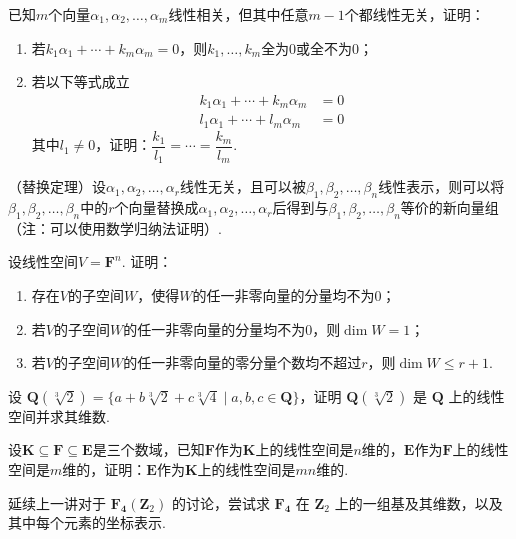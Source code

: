 \begin{exercise}
    \begin{exgroup}
        \item 已知$m$个向量$\alpha_1,\alpha_2,\ldots,\alpha_m$线性相关，但其中任意$m-1$个都线性无关，证明：
        \begin{enumerate}
            \item 若$k_1\alpha_1+\cdots+k_m\alpha_m=0$，则$k_1,\ldots,k_m$全为0或全不为0；

            \item 若以下等式成立
                  \begin{align*}
                      k_1\alpha_1+\cdots+k_m\alpha_m & =0 \\
                      l_1\alpha_1+\cdots+l_m\alpha_m & =0
                  \end{align*}
                  其中$l_1\neq 0$，证明：$\dfrac{k_1}{l_1}=\cdots=\dfrac{k_m}{l_m}$.
        \end{enumerate}

        \item （替换定理）设$\alpha_1,\alpha_2,\ldots,\alpha_r$线性无关，且可以被$\beta_1,\beta_2,\ldots,\beta_n$线性表示，则可以将$\beta_1,\beta_2,\ldots,\beta_n$中的$r$个向量替换成$\alpha_1,\alpha_2,\ldots,\alpha_r$后得到与$\beta_1,\beta_2,\ldots,\beta_n$等价的新向量组（注：可以使用数学归纳法证明）.

        \item 设线性空间$V=\mathbf{F}^n$. 证明：
        \begin{enumerate}
            \item 存在$V$的子空间$W$，使得$W$的任一非零向量的分量均不为0；

            \item 若$V$的子空间$W$的任一非零向量的分量均不为0，则$\dim W=1$；

            \item 若$V$的子空间$W$的任一非零向量的零分量个数均不超过$r$，则$\dim W \leqslant r+1$.
        \end{enumerate}

        \item 设 $\mathbf{Q}(\sqrt[3]{2}) = \{a+b\sqrt[3]{2}+c\sqrt[3]{4}\mid a,b,c\in\mathbf{Q}\}$，证明 $\mathbf{Q}(\sqrt[3]{2})$ 是 $\mathbf{Q}$ 上的线性空间并求其维数.

        \item 设$\mathbf{K} \subseteq \mathbf{F} \subseteq \mathbf{E}$是三个数域，已知$\mathbf{F}$作为$\mathbf{K}$上的线性空间是$n$维的，$\mathbf{E}$作为$\mathbf{F}$上的线性空间是$m$维的，证明：$\mathbf{E}$作为$\mathbf{K}$上的线性空间是$mn$维的.

        \item 延续上一讲对于 $\mathbf{F_4}(\mathbf{Z}_2)$ 的讨论，尝试求 $\mathbf{F_4}$ 在 $\mathbf{Z}_2$ 上的一组基及其维数，以及其中每个元素的坐标表示.
    \end{exgroup}
\end{exercise}
